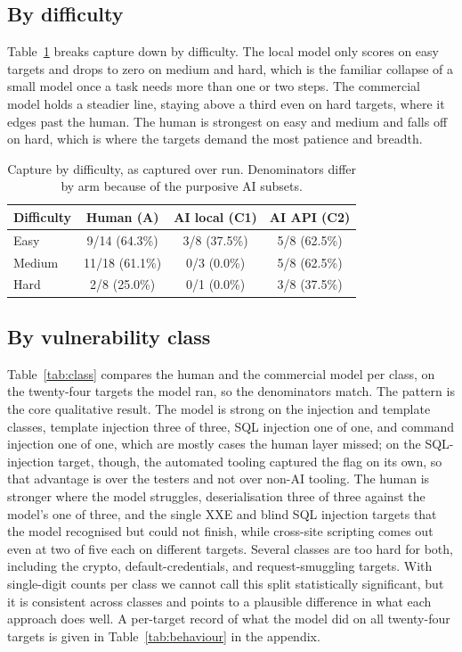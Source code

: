 \documentclass[11pt]{article}
\begin{document}
\subsection{By difficulty}
Table~\ref{tab:difficulty} breaks capture down by difficulty. The local model only scores on easy targets and drops to zero on medium and hard, which is the familiar collapse of a small model once a task needs more than one or two steps. The commercial model holds a steadier line, staying above a third even on hard targets, where it edges past the human. The human is strongest on easy and medium and falls off on hard, which is where the targets demand the most patience and breadth.

\begin{table}[htbp]
\centering
\caption{Capture by difficulty, as captured over run. Denominators differ by arm because of the purposive AI subsets.}
\label{tab:difficulty}
\small
\begin{tabular}{@{}lccc@{}}
\toprule
Difficulty & Human (A) & AI local (C1) & AI API (C2) \\
\midrule
Easy   & 9/14 (64.3\%) & 3/8 (37.5\%) & 5/8 (62.5\%) \\
Medium & 11/18 (61.1\%) & 0/3 (0.0\%)  & 5/8 (62.5\%) \\
Hard   & 2/8 (25.0\%)  & 0/1 (0.0\%)  & 3/8 (37.5\%) \\
\bottomrule
\end{tabular}
\end{table}

\subsection{By vulnerability class}
Table~\ref{tab:class} compares the human and the commercial model per class, on the twenty-four targets the model ran, so the denominators match. The pattern is the core qualitative result. The model is strong on the injection and template classes, template injection three of three, SQL injection one of one, and command injection one of one, which are mostly cases the human layer missed; on the SQL-injection target, though, the automated tooling captured the flag on its own, so that advantage is over the testers and not over non-AI tooling. The human is stronger where the model struggles, deserialisation three of three against the model's one of three, and the single XXE and blind SQL injection targets that the model recognised but could not finish, while cross-site scripting comes out even at two of five each on different targets. Several classes are too hard for both, including the crypto, default-credentials, and request-smuggling targets. With single-digit counts per class we cannot call this split statistically significant, but it is consistent across classes and points to a plausible difference in what each approach does well. A per-target record of what the model did on all twenty-four targets is given in Table~\ref{tab:behaviour} in the appendix.
\end{document}
